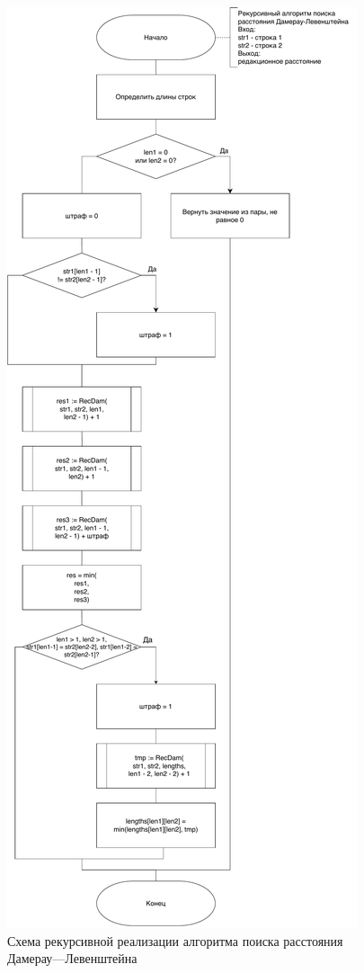 \begin{figure}[H]
	\centering
	\includegraphics[scale=0.35]{assets/dam-lev-rec.pdf}
	\caption{Схема рекурсивной реализации алгоритма поиска расстояния Дамерау---Левенштейна}
	\label{pic:rec-dam-lev}
\end{figure}


